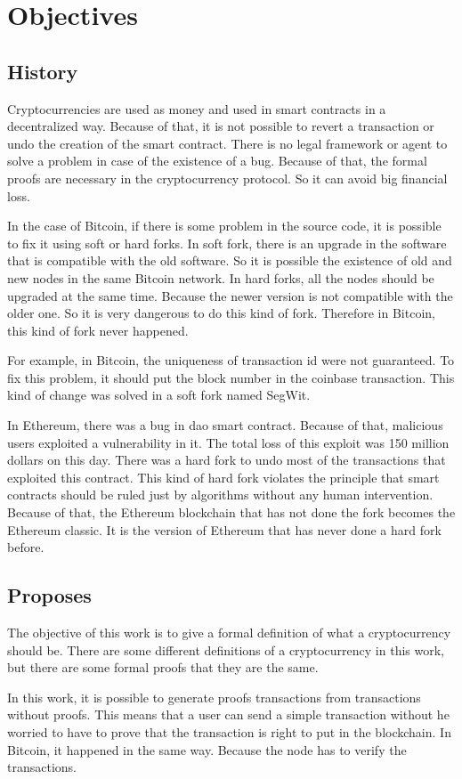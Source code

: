 \section{Objectives}

\subsection{History}

Cryptocurrencies are used as money and used in smart contracts in a decentralized way.
Because of that, it is not possible to revert a transaction or undo the creation of the smart contract.
There is no legal framework or agent to solve a problem in case of the existence of a bug.
Because of that, the formal proofs are necessary in the cryptocurrency protocol.
So it can avoid big financial loss.

In the case of Bitcoin, if there is some problem in the source code,
it is possible to fix it using soft or hard forks.
In soft fork, there is an upgrade in the software that is compatible with the old software.
So it is possible the existence of old and new nodes in the same Bitcoin network.
In hard forks, all the nodes should be upgraded at the same time.
Because the newer version is not compatible with the older one.
So it is very dangerous to do this kind of fork.
Therefore in Bitcoin, this kind of fork never happened.

For example, in Bitcoin, the uniqueness of transaction \gls{id} were not guaranteed.
To fix this problem, it should put the block number in the coinbase transaction.
This kind of change was solved in a soft fork named SegWit.

In Ethereum, there was a bug in \gls{dao} smart contract.
Because of that, malicious users exploited a vulnerability in it.
The total loss of this exploit was 150 million dollars on this day.
There was a hard fork to undo most of the transactions that exploited this contract.
This kind of hard fork violates the principle that smart contracts should be ruled just by
algorithms without any human intervention.
Because of that, the Ethereum blockchain that has not done the fork becomes the Ethereum classic.
It is the version of Ethereum that has never done a hard fork before.

\subsection{Proposes}

The objective of this work is to give a formal definition of what a cryptocurrency should be.
There are some different definitions of a cryptocurrency in this work,
but there are some formal proofs that they are the same.

In this work, it is possible to generate proofs transactions from transactions without proofs.
This means that a user can send a simple transaction without he worried to have to prove that
the transaction is right to put in the blockchain.
In Bitcoin, it happened in the same way.
Because the node has to verify the transactions.
